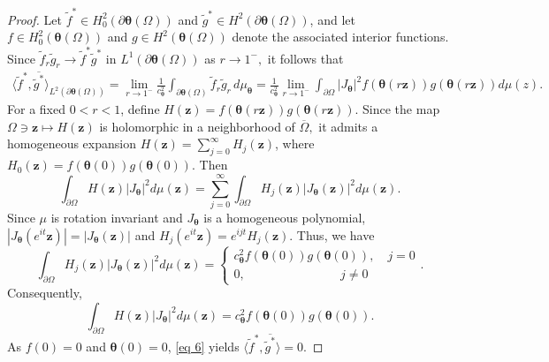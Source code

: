 \documentclass[12pt,reqno]{amsart}
\theoremstyle{remark}
\theoremstyle{definition}
\newcommand{\beq}{\begin{eqnarray}}
\newcommand{\eeq}{\end{eqnarray}}
\def \z{\boldsymbol{z}}
\def \\theta{\boldsymbol{\theta}}
\def \\xi{\boldsymbol{\xi}}
\begin{document}
\begin{proof}
Let $\tilde f^*\in H_0^2(\partial\boldsymbol \theta(\Omega))$ and $\tilde g^*\in H^2(\partial\boldsymbol \theta(\Omega))$, and let $f\in H^2_0(\boldsymbol \theta(\Omega))$ and $g\in H^2(\boldsymbol \theta(\Omega))$ denote the associated interior functions. Since $\tilde f_r\tilde g_r \longrightarrow \tilde f^*\tilde g^*$ in $L^1(\partial\boldsymbol \theta(\Omega))$ as $r\to 1^-,$
it follows that \beq \label{eq 6}\langle \tilde f^*,\overline{\tilde g^*}\rangle_{L^2(\partial\boldsymbol \theta(\Omega))} = \lim_{r\to1^-} \frac{1}{c_{\boldsymbol \theta}^2}\int_{\partial\boldsymbol \theta(\Omega)} \tilde f_r\tilde g_r\, d\mu_{\boldsymbol \theta}=\frac{1}{c_{\boldsymbol \theta}^2}\lim_{r\to 1^-} \int_{\partial\Omega} |J_{\boldsymbol \theta}|^2 f(\boldsymbol \theta(r\z))g(\boldsymbol \theta(r\z)) d\mu(z).\eeq 
For a fixed $0<r<1$, define $H(\z)=f(\boldsymbol \theta(r\z))g(\boldsymbol \theta(r\z))$. Since the map $ \Omega\ni \z \mapsto H(\z)$ is holomorphic in a neighborhood of $\overline{\Omega},$ it admits a homogeneous expansion
 $H(\z)=\sum_{j=0}^\infty H_j(\z)$, where $H_0(\z)=f(\boldsymbol \theta(0)) g(\boldsymbol \theta(0)).$ Then $$\int_{\partial\Omega} H(\z)|J_{\boldsymbol \theta}|^2 d\mu(\z)= \sum_{j=0}^\infty \int_{\partial\Omega} H_j(\z) |J_{\boldsymbol \theta}(\z)|^2 d\mu(\z).$$
Since $\mu$ is rotation invariant and $J_{\boldsymbol \theta}$ is a homogeneous polynomial, $|J_{\boldsymbol \theta}(e^{it} \z)|=|J_{\boldsymbol \theta}(\z)|$ and $H_j(e^{it}\z)=e^{ijt} H_{j}(\z).$ 
Thus, we have $$\int_{\partial \Omega} H_{j}(\z)|J_{\boldsymbol \theta}(\z)|^2 d\mu(\z)=\begin{cases}
    c_{\boldsymbol\theta}^2 f(\boldsymbol\theta(0))g(\boldsymbol\theta(0)), \quad j=0\\
    0, \qquad\qquad\qquad\;\;\;\;\;\; j\neq 0
\end{cases}.$$
Consequently, $$\int_{\partial\Omega} H(\z)|J_{\boldsymbol \theta}|^2 d\mu(\z)=c_{\boldsymbol \theta}^2 f(\boldsymbol \theta(0)) g(\boldsymbol \theta(0)).$$
As $f(0)=0$ and $\boldsymbol \theta(0)=0$, \eqref{eq 6} yields $\langle \tilde f^*,\overline{\tilde g^*}\rangle=0.$
\end{proof}
\end{document}
